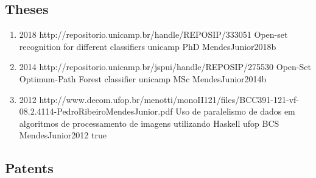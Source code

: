 \subsection*{Theses}

\begin{enumerate}[resume]
\item{}
  {2018}
  {http://repositorio.unicamp.br/handle/REPOSIP/333051}
  {Open-set recognition for different classifiers}
  {unicamp}
  {PhD}
  {MendesJunior2018b}
  {}
\item{}
  {2014}
  {http://repositorio.unicamp.br/jspui/handle/REPOSIP/275530}
  {Open-Set Optimum-Path Forest classifier}
  {unicamp}
  {MSc}
  {MendesJunior2014b}
  {}
\item{}
  {2012}
  {http://www.decom.ufop.br/menotti/monoII121/files/BCC391-121-vf-08.2.4114-PedroRibeiroMendesJunior.pdf}
  {Uso de paralelismo de dados em algoritmos de processamento de imagens utilizando Haskell}
  {ufop}
  {BCS}
  {MendesJunior2012}
  {true}
\end{enumerate}

\subsection*{Patents}

